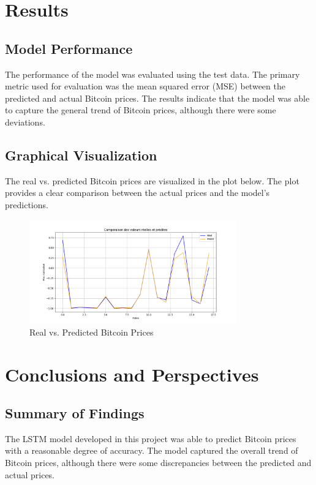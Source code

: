 \documentclass{article}
\begin{document}
\section{Results}
\subsection{Model Performance}
The performance of the model was evaluated using the test data. The primary metric used for evaluation was the mean squared error (MSE) between the predicted and actual Bitcoin prices. The results indicate that the model was able to capture the general trend of Bitcoin prices, although there were some deviations.

\subsection{Graphical Visualization}
The real vs. predicted Bitcoin prices are visualized in the plot below. The plot provides a clear comparison between the actual prices and the model's predictions.

\begin{figure}[h]
    \centering
    \includegraphics[width=0.8\textwidth]{img/Prediction.png}
    \caption{Real vs. Predicted Bitcoin Prices}
    \label{fig:predictions}
\end{figure}

\section{Conclusions and Perspectives}
\subsection{Summary of Findings}
The LSTM model developed in this project was able to predict Bitcoin prices with a reasonable degree of accuracy. The model captured the overall trend of Bitcoin prices, although there were some discrepancies between the predicted and actual prices.
\end{document}
